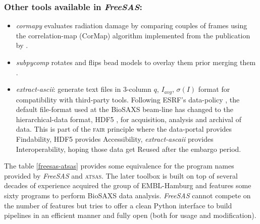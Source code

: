 \documentclass[preprint]{iucr}              %
\begin{document}
\subsubsection{Other tools available in \textit{FreeSAS}:}
\begin{itemize}
    \item \textit{cormapy} evaluates radiation damage by comparing couples of frames using the correlation-map (CorMap) algorithm implemented from the publication by .
    \item \textit{subpycomp} rotates and flips  bead models to overlay them prior merging them \cite{BM29ODA}.
    \item \textit{extract-ascii}: generate text files in 3-column $q$, $I_{avg}$, $\sigma(I)$ format for compatibility with third-party tools. Following ESRF's data-policy \cite{data-policy}, the default file-format used at the BioSAXS beam-line has changed to the hierarchical-data format, HDF5 \cite{hdf5}, for acquisition, analysis and archival of data. This is part of the \textsc{fair} principle \cite{FAIR} where the data-portal \cite{data-portal} provides Findability, HDF5 provides Accessibility, \textit{extract-ascaii} provides Interoperability, hoping those data get Reused after the embargo period.
\end{itemize}

The table \ref{freesas-atsas} provides some equivalence for the program names provided by \textit{FreeSAS} and \textsc{atsas}.
The later toolbox is built on top of several decades of experience acquired the group of EMBL-Hamburg and features some sixty programs to perform BioSAXS data analysis.
\textit{FreeSAS} cannot compete on the number of features but tries to offer a clean Python interface to build pipelines in an efficient manner and fully open (both for usage and modification).
\end{document}

